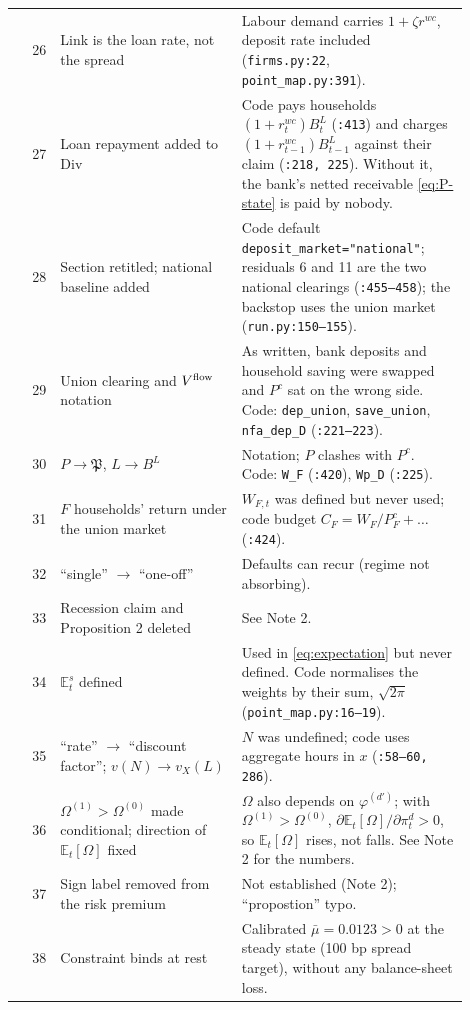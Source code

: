 \documentclass[11pt]{article}
\newcommand{\E}{\mathbb{E}}
\begin{document}
\begin{longtable}{@{}r p{0.40\linewidth} p{0.50\linewidth}@{}}
26 & Link is the loan rate, not the spread & Labour demand carries $1+\zeta r^{wc}$, deposit rate included (\texttt{firms.py:22}, \texttt{point\_map.py:391}). \\
27 & Loan repayment added to $\mathrm{Div}$ & Code pays households $(1+r^{wc}_t)B^L_t$ (\texttt{:413}) and charges $(1+r^{wc}_{t-1})B^L_{t-1}$ against their claim (\texttt{:218, 225}). Without it, the bank's netted receivable \eqref{eq:P-state} is paid by nobody. \\
28 & Section retitled; national baseline added & Code default \texttt{deposit\_market="national"}; residuals 6 and 11 are the two national clearings (\texttt{:455--458}); the backstop uses the union market (\texttt{run.py:150--155}). \\
29 & Union clearing and $V^{\rm flow}$ notation & As written, bank deposits and household saving were swapped and $P^c$ sat on the wrong side. Code: \texttt{dep\_union}, \texttt{save\_union}, \texttt{nfa\_dep\_D} (\texttt{:221--223}). \\
30 & $P\to\mathfrak{P}$, $L\to B^L$ & Notation; $P$ clashes with $P^c$. Code: \texttt{W\_F} (\texttt{:420}), \texttt{Wp\_D} (\texttt{:225}). \\
31 & $F$ households' return under the union market & $W_{F,t}$ was defined but never used; code budget $C_F=W_F/P^c_F+\dots$ (\texttt{:424}). \\
32 & ``single'' $\to$ ``one-off'' & Defaults can recur (regime not absorbing). \\
33 & Recession claim and Proposition 2 deleted & See Note 2. \\
34 & $\E^s_t$ defined & Used in \eqref{eq:expectation} but never defined. Code normalises the weights by their sum, $\sqrt{2\pi}$ (\texttt{point\_map.py:16--19}). \\
35 & ``rate'' $\to$ ``discount factor''; $v(N)\to v_X(L)$ & $N$ was undefined; code uses aggregate hours in $x$ (\texttt{:58--60, 286}). \\
36 & $\Omega^{(1)}>\Omega^{(0)}$ made conditional; direction of $\E_t[\Omega]$ fixed & $\Omega$ also depends on $\varphi^{(d')}$; with $\Omega^{(1)}>\Omega^{(0)}$, $\partial\E_t[\Omega]/\partial\pi^d_t>0$, so $\E_t[\Omega]$ rises, not falls. See Note 2 for the numbers. \\
37 & Sign label removed from the risk premium & Not established (Note 2); ``propostion'' typo. \\
38 & Constraint binds at rest & Calibrated $\bar\mu=0.0123>0$ at the steady state (100 bp spread target), without any balance-sheet loss. \\

\end{longtable}
\end{document}
